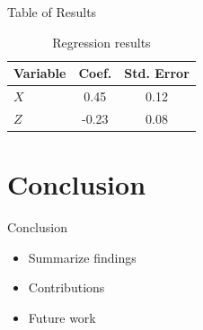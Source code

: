 \documentclass{beamer}
\begin{document}
\begin{frame}{Table of Results}
  \begin{table}
    \centering
    \begin{tabular}{lcc}
      \toprule
      Variable & Coef. & Std. Error \\
      \midrule
      $X$ & 0.45 & 0.12 \\
      $Z$ & -0.23 & 0.08 \\
      \bottomrule
    \end{tabular}
    \caption{Regression results}
  \end{table}
\end{frame}

\section{Conclusion}

\begin{frame}{Conclusion}
  \begin{itemize}
    \item Summarize findings
    \item Contributions
    \item Future work
  \end{itemize}
\end{frame}
\end{document}
